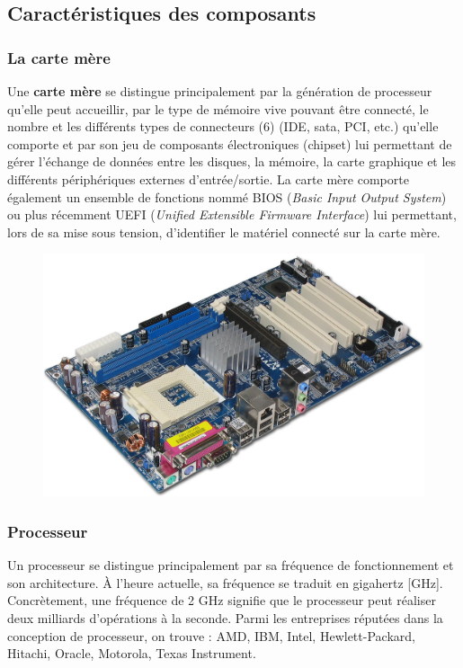\documentclass[11pt, a4paper]{book}
\begin{document}
\subsection{ Caractéristiques des composants}


\subsubsection{La carte mère}

Une {\bf carte mère} se distingue principalement par la génération de processeur qu'elle peut accueillir, par le type de mémoire vive pouvant être connecté, le nombre et les différents types de connecteurs (6) (IDE, sata, PCI, etc.) qu'elle comporte  et par son jeu de composants électroniques (chipset) lui permettant de gérer l'échange de données entre les disques, la mémoire, la carte graphique et les différents périphériques externes d'entrée/sortie. La carte mère comporte également un ensemble de fonctions nommé BIOS ({\it Basic Input Output System}) ou plus récemment UEFI ({\it Unified Extensible Firmware Interface}) lui permettant, lors de sa mise sous tension, d'identifier le matériel connecté sur la carte mère.

\begin{figure}[h]
	\centering
	\includegraphics[scale=.4]{images/cartemere}

\end{figure}

\subsubsection{Processeur}

Un processeur se distingue principalement par sa fréquence de fonctionnement et son architecture. À l’heure actuelle, sa fréquence se traduit en gigahertz [GHz]. Concrètement, une fréquence de 2 GHz signifie que le processeur peut réaliser deux milliards d'opérations à la seconde. Parmi les entreprises réputées dans la conception de processeur, on trouve : AMD, IBM, Intel, Hewlett-Packard, Hitachi, Oracle, Motorola, Texas Instrument.
\end{document}
